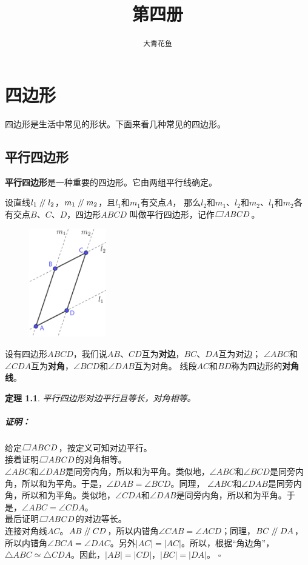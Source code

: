 \documentclass[12pt,UTF8]{ctexbook}
\title{\zihao{0} \bfseries 第四册}
\author{\zihao{2} \texttt{大青花鱼}}
\date{}
\newtheorem{tm}{定理}[section]
\newenvironment{proof2}{\paragraph{\textbf{证明：}}}{\hfill$\square$}
\renewcommand\parallel{\mathrel{/\mskip-4mu/}}
\newcommand\parasbx{%
    \mathord{\text{%
        \tikz[baseline] \draw (0,.1ex) -- (.8em,.1ex) -- (1em,1.6ex) -- (.2em,1.6ex) -- cycle;}}}
\begin{document}
\maketitle
\tableofcontents
\newpage

\chapter{四边形}
四边形是生活中常见的形状。下面来看几种常见的四边形。
\section{平行四边形}

\textbf{平行四边形}是一种重要的四边形。它由两组平行线确定。

设直线$l_1 \parallel l_2$，$m_1 \parallel m_2$，且$l_1$和$m_1$有交点$A$，
那么$l_2$和$m_1$、$l_2$和$m_2$、$l_1$和$m_2$各有交点$B$、$C$、$D$，四边形$ABCD$
叫做平行四边形，记作$\parasbx ABCD$。

\begin{figure} %
    \vspace{-24pt}
    \centering
    \includegraphics[width=0.3\textwidth]{tu/平行四边形0.png}
\end{figure}

设有四边形$ABCD$，我们说$AB$、$CD$互为\textbf{对边}，$BC$、$DA$互为对边；
$\angle ABC$和$\angle CDA$互为\textbf{对角}，$\angle BCD$和$\angle DAB$互为对角。
线段$AC$和$BD$称为四边形的\textbf{对角线}。

\begin{tm}\label{tm:0-0-0}
    平行四边形对边平行且等长，对角相等。
\end{tm}
\begin{proof2}
    给定$\parasbx ABCD$，按定义可知对边平行。\\
    接着证明$\parasbx ABCD$的对角相等。\\
    $\angle ABC$和$\angle DAB$是同旁内角，所以和为平角。类似地，$\angle ABC$和$\angle BCD$是同旁内角，所以和为平角。于是，$\angle DAB = \angle BCD$。同理， $\angle ABC$和$\angle DAB$是同旁内角，所以和为平角。类似地，$\angle CDA$和$\angle DAB$是同旁内角，所以和为平角。于是，$\angle ABC = \angle CDA$。\\
    最后证明$\parasbx ABCD$的对边等长。\\
    连接对角线$AC$。$AB \parallel CD$，所以内错角$\angle CAB = \angle ACD$；同理，$BC \parallel DA$，所以内错角$\angle BCA = \angle DAC$。另外$|AC| = |AC|$。所以，根据“角边角”，$\triangle ABC \simeq \triangle CDA$。因此，$|AB| = |CD|$，$|BC| = |DA|$。    
\end{proof2}
\end{document}
